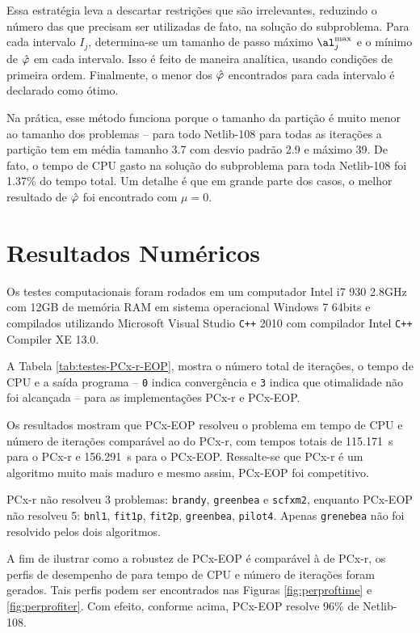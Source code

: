 Essa estratégia leva a descartar restrições que são irrelevantes, reduzindo o número das que precisam ser utilizadas de fato, na solução do subproblema.  Para cada intervalo $I_{j}$, determina-se um tamanho de passo máximo $\al^{\max}_{j}$ e o mínimo de $\hat{\varphi}$ em cada intervalo. Isso é feito 	de maneira analítica, usando condições de primeira ordem. Finalmente, o menor dos $\hat{\varphi}$ encontrados para cada intervalo é declarado como ótimo.

Na prática, esse método funciona porque o tamanho da partição é muito menor ao tamanho dos problemas -- para todo Netlib-108 para todas as iterações a partição tem em média tamanho \num{3.7} com desvio padrão \num{2.9} e máximo \num{39}. De fato, o tempo  de CPU gasto na solução do subproblema  para toda Netlib-108 foi \num{1,37}\% do tempo total. Um detalhe é que em grande parte dos casos, o melhor resultado de $\hat{\varphi}$ foi encontrado com $\mu=0$.




\section{Resultados Numéricos}

Os testes computacionais foram rodados em um computador Intel i7 930 2.8GHz com \num{12}GB de memória RAM em sistema operacional Windows 7 \num{64}bits e compilados utilizando Microsoft Visual Studio \texttt{C++} 2010 com compilador Intel \texttt{C++} Compiler  XE 13.0.

A Tabela \ref{tab:testes-PCx-r-EOP}, mostra o número total de iterações, o tempo de CPU e a saída programa -- \texttt{0} indica convergência e \texttt{3} indica que otimalidade não foi alcançada -- para as implementações PCx-r e PCx-EOP. 




Os resultados mostram que PCx-EOP resolveu o problema em tempo de CPU e número de iterações comparável ao do PCx-r, com tempos totais de \SI{115.171}{s} para o PCx-r e \SI{156,291}{s} para o PCx-EOP. Ressalte-se que PCx-r é um algoritmo muito mais maduro  e mesmo assim, PCx-EOP foi competitivo.
 
 PCx-r não resolveu \num{3} problemas: \texttt{brandy}, \texttt{greenbea} e \texttt{scfxm2}, enquanto PCx-EOP não resolveu \num{5}:  \texttt{bnl1}, \texttt{fit1p}, \texttt{fit2p}, \texttt{greenbea}, \texttt{pilot4}. Apenas \texttt{grenebea} não foi resolvido pelos dois algoritmos. 

A fim de ilustrar como a robustez de PCx-EOP é comparável à de PCx-r, os perfis de desempenho de \textcite{Dolan:2002du} para tempo de CPU e número de iterações foram gerados. Tais perfis podem ser encontrados nas Figuras \ref{fig:perproftime} e \ref{fig:perprofiter}. Com efeito, conforme acima, PCx-EOP resolve 96\% de Netlib-108.


